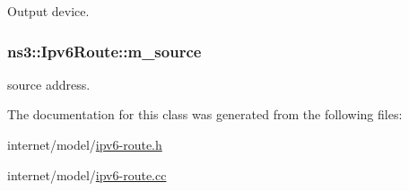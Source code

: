 Output device. 

\subsubsection[{\texorpdfstring{m\+\_\+source}{m_source}}]{ ns3\+::\+Ipv6\+Route\+::m\+\_\+source\hspace{0.3cm}{\ttfamily [private]}}\hypertarget{classns3_1_1Ipv6Route_a8b3683bd8c4337630df3a83c18a9fa38}{}\label{classns3_1_1Ipv6Route_a8b3683bd8c4337630df3a83c18a9fa38}


source address. 



The documentation for this class was generated from the following files\+:\begin{DoxyCompactItemize}
\item 
internet/model/\hyperlink{ipv6-route_8h}{ipv6-\/route.\+h}\item 
internet/model/\hyperlink{ipv6-route_8cc}{ipv6-\/route.\+cc}\end{DoxyCompactItemize}
